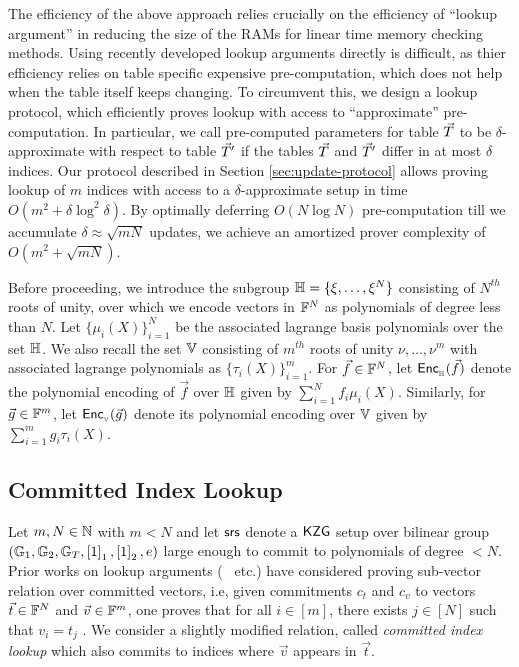 The efficiency of the above approach relies crucially on the efficiency of ``lookup argument'' in reducing the size of the RAMs for
linear time memory checking methods. Using recently developed lookup arguments directly is difficult, as thier efficiency relies on
table specific expensive pre-computation, which does not help when the table itself keeps changing. To circumvent this, we design a
lookup protocol, which efficiently proves lookup with access to ``approximate'' pre-computation. In particular, we call pre-computed
parameters for table $\vec{T}$ to be $\delta$-approximate with respect to table $\vec{T}'$ if the tables $\vec{T}$ and $\vec{T}'$ differ in
at most $\delta$ indices. Our protocol described in Section \ref{sec:update-protocol} allows proving lookup of $m$ indices with access
to a $\delta$-approximate setup in time $O(m^2+\delta\log^2 \delta)$. By optimally deferring $O(N\log N)$ pre-computation till we
accumulate $\delta \approx \sqrt{mN}$ updates, we achieve an amortized prover complexity of $O(m^2+\sqrt{mN})$.

Before proceeding, we introduce the subgroup $\mathbb{H}=\{\xi,\ldots,\xi^N\}$ consisting of $N^{th}$ roots of unity,
over which we encode vectors in $\mathbb{F}^N$ as polynomials of degree less than $N$. Let $\{\mu_i(X)\}_{i=1}^N$ be the associated
lagrange basis polynomials over the set $\mathbb{H}$. We also recall the set $\mathbb{V}$ consisting of $m^{th}$ roots of unity
$\nu,\ldots,\nu^m$ with associated lagrange polynomials as $\{\tau_i(X)\}_{i=1}^m$. For $\vec{f}\in \mathbb{F}^N$, let
$\mathsf{Enc}_{{}_{\mathbb{H}}}(\vec{f})$ denote the polynomial encoding of $\vec{f}$ over $\mathbb{H}$ given by $\sum_{i=1}^N f_i\mu_i(X)$. Similarly,
for $\vec{g}\in \mathbb{F}^m$, let $\mathsf{Enc}_{{}_{\mathbb{V}}}(\vec{g})$ denote its polynomial encoding over $\mathbb{V}$ given by $\sum_{i=1}^m g_i\tau_i(X)$.


\subsection{Committed Index Lookup}\label{subsec:committed-index-lookup}
Let $m,N\in \mathbb{N}$ with $m < N$ and let $\mathsf{srs}$ denote a $\mathsf{KZG}$ setup over bilinear group $(\mathbb{G}_1,\mathbb{G}_2,\mathbb{G}_T,\left[{1}\right]_1,\left[{1}\right]_2,e)$
large enough to commit to polynomials of degree $<N$. Prior works on lookup arguments (~\cite{CCS:ZBKMNS22,EPRINT:PosKat22} etc.)
have considered proving sub-vector relation over committed vectors, i.e, given commitments $c_t$ and $c_v$ to vectors $\vec{t}\in \mathbb{F}^N$
and $\vec{v}\in \mathbb{F}^m$, one proves that for all $i\in [m]$, there exists $j\in [N]$ such that $v_i=t_j$ .
We consider a slightly modified relation,
called {\em committed index lookup}  which also commits to indices where $\vec{v}$ appears in $\vec{t}$.

